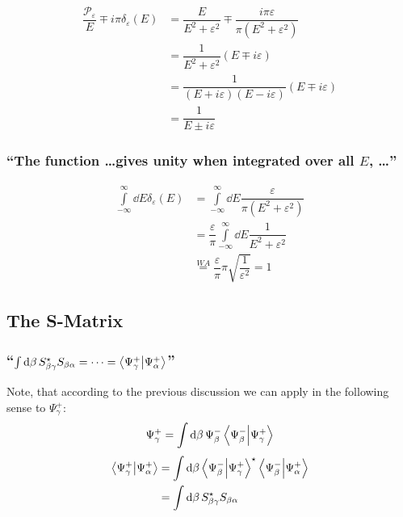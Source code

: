 \todo

\subsubsection{ }
\begin{align*}
	\dfrac{\mathcal{P}_\varepsilon}{E}\mp i \pi \delta_\varepsilon(E)&=
	\dfrac{E}{E^2+\varepsilon^2} \mp \dfrac{i \pi \varepsilon}{\pi (E^2+\varepsilon^2)}\\
	&=\dfrac{1}{E^2+\varepsilon^2}(E\mp i \varepsilon)\\
	&=\dfrac{1}{(E+i\varepsilon)(E-i\varepsilon)}(E\mp i \varepsilon)\\
	&=\dfrac{1}{E\pm i \varepsilon}
\end{align*}

\subsubsection{\enquote{The function \dots gives unity when integrated over all $E$, \dots} }

\begin{align*}
	\int\limits_{-\infty}^{\infty} \dd{E} \delta_\varepsilon (E)&=
	\int\limits_{-\infty}^{\infty} \dd{E} \dfrac{\varepsilon}{\pi(E^2+\varepsilon^2)}\\
	&=\dfrac{\varepsilon}{\pi}\int\limits_{-\infty}^{\infty} \dd{E}\dfrac{1}{E^2+\varepsilon^2}\\
	&\overset{WA}{=}\dfrac{\varepsilon}{\pi} \pi \sqrt{\dfrac{1}{\varepsilon^2}}=1
\end{align*}

\subsection{The S-Matrix}\label{susec:3_2}

\subsubsection{\enquote{$\int\dd{\beta}S_{\beta\gamma}^\star S_{\beta\alpha}=\dots=\innerproduct{\Psi_\gamma^+}{\Psi_\alpha^+}$} }

Note, that according to the previous discussion we can apply  in the following sense to $\Psi_\gamma^+$:
\[\Psi_\gamma^+=\int\dd{\beta}\Psi_\beta^-\innerproduct{\Psi_\beta^-}{\Psi_\gamma^+}\]
\begin{align*}
	\innerproduct{\Psi_\gamma^+}{\Psi_\alpha^+}&=
	\int\dd{\beta}\innerproduct{\Psi_\beta^-}{\Psi_\gamma^+}^\star \innerproduct{\Psi_\beta^-}{\Psi_\alpha^+}\\
	&=\int\dd{\beta} S_{\beta\gamma}^\star S_{\beta\alpha}
\end{align*}

